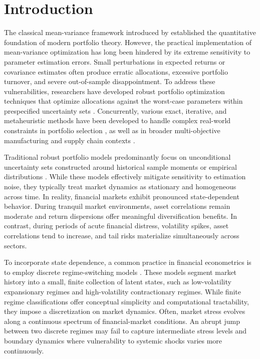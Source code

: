 \documentclass[smallextended]{svjour3}
\begin{document}
\section{Introduction}
The classical mean-variance framework introduced by \cite{markowitz1952portfolio} established the quantitative foundation of modern portfolio theory. However, the practical implementation of mean-variance optimization has long been hindered by its extreme sensitivity to parameter estimation errors. Small perturbations in expected returns or covariance estimates often produce erratic allocations, excessive portfolio turnover, and severe out-of-sample disappointment. To address these vulnerabilities, researchers have developed robust portfolio optimization techniques that optimize allocations against the worst-case parameters within prespecified uncertainty sets \cite{goldfarb2003robust, fabozzi2007robust}. Concurrently, various exact, iterative, and metaheuristic methods have been developed to handle complex real-world constraints in portfolio selection \cite{bezoui2019iterative, regaigui2025memetic}, as well as in broader multi-objective manufacturing and supply chain contexts \cite{bezoui2024hybrid}.

Traditional robust portfolio models predominantly focus on unconditional uncertainty sets constructed around historical sample moments or empirical distributions \cite{delage2010distributionally, esfahani2018data}. While these models effectively mitigate sensitivity to estimation noise, they typically treat market dynamics as stationary and homogeneous across time. In reality, financial markets exhibit pronounced state-dependent behavior. During tranquil market environments, asset correlations remain moderate and return dispersions offer meaningful diversification benefits. In contrast, during periods of acute financial distress, volatility spikes, asset correlations tend to increase, and tail risks materialize simultaneously across sectors.

To incorporate state dependence, a common practice in financial econometrics is to employ discrete regime-switching models \cite{ang2002international}. These models segment market history into a small, finite collection of latent states, such as low-volatility expansionary regimes and high-volatility contractionary regimes. While finite regime classifications offer conceptual simplicity and computational tractability, they impose a discretization on market dynamics. Often, market stress evolves along a continuous spectrum of financial-market conditions. An abrupt jump between two discrete regimes may fail to capture intermediate stress levels and boundary dynamics where vulnerability to systemic shocks varies more continuously.
\end{document}
